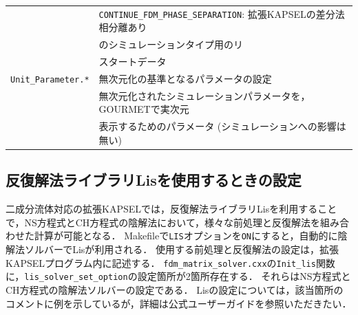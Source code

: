 \documentclass[pdflatex,a4paper,10pt,ja=standard]{bxjsarticle}
\begin{document}
\begin{longtable}{ll}
    & \verb|CONTINUE_FDM_PHASE_SEPARATION|: 拡張KAPSELの差分法相分離あり\\
    & \hspace{36.0ex} のシミュレーションタイプ用のリ\\
    & \hspace{36.0ex} スタートデータ\\
    \verb|Unit_Parameter.*| & 無次元化の基準となるパラメータの設定\\
    & 無次元化されたシミュレーションパラメータを，GOURMETで実次元\\
    & 表示するためのパラメータ (シミュレーションへの影響は無い)\\
    \bottomrule
\end{longtable}

\subsection{反復解法ライブラリLisを使用するときの設定}
\label{sec:lis_settings}

二成分流体対応の拡張KAPSELでは，反復解法ライブラリLisを利用することで，NS方程式とCH方程式の陰解法において，様々な前処理と反復解法を組み合わせた計算が可能となる．
Makefileで\verb|LIS|オプションを\verb|ON|にすると，自動的に陰解法ソルバーでLisが利用される．
使用する前処理と反復解法の設定は，拡張KAPSELプログラム内に記述する．
\verb|fdm_matrix_solver.cxx|の\verb|Init_lis|関数に，\verb|lis_solver_set_option|の設定箇所が2箇所存在する．
それらはNS方程式とCH方程式の陰解法ソルバーの設定である．
Lisの設定については，該当箇所のコメントに例を示しているが，詳細は公式ユーザーガイド\autocite{lis_document}を参照いただきたい．
\printbibliography
\end{document}
